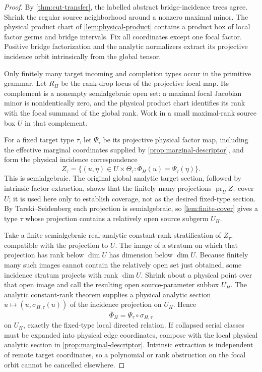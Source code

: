 \begin{proof}
By \cref{thm:cut-transfer}, the labelled abstract bridge-incidence trees
agree.  Shrink
the regular source neighborhood around a nonzero maximal minor.  The physical
product chart of \cref{lem:physical-product} contains a product box of local
factor germs and bridge intervals.  Fix all coordinates except one focal
factor.  Positive bridge factorization and the analytic normalizers extract
its projective incidence orbit intrinsically from the global tensor.

Only finitely many target incoming and completion types occur in the
primitive grammar.  Let \(R_H\) be the rank-drop locus of the projective focal
map.  Its complement is a nonempty semialgebraic open set: a maximal focal
Jacobian minor is nonidentically zero, and the physical product chart
identifies its rank with the focal summand of the global rank.  Work in a
small maximal-rank source box \(U\) in that complement.

For a fixed target type \(\tau\), let \(\Psi_\tau\) be its projective physical
factor map, including the effective marginal coordinates supplied by
\cref{prop:marginal-descriptor}, and form the physical incidence
correspondence
\[
 Z_\tau=\{(u,\eta)\in U\times\Theta_\tau:
             \overline\Phi_H(u)=\Psi_\tau(\eta)\}.
\]
This is semialgebraic.  The original global analytic target section, followed
by intrinsic factor extraction, shows that the finitely many projections
\(\operatorname{pr}_U Z_\tau\) cover \(U\); it is used here only to establish
coverage, not as the desired fixed-type section.  By Tarski--Seidenberg each
projection is semialgebraic, so \cref{lem:finite-cover} gives a type \(\tau\)
whose projection contains a relatively open source subgerm \(U_H\).

Take a finite semialgebraic real-analytic constant-rank stratification of
\(Z_\tau\), compatible with the projection to \(U\).  The image of a stratum
on which that projection has rank below \(\dim U\) has dimension below
\(\dim U\).  Because finitely many such images cannot contain the relatively
open set just obtained, some incidence stratum projects with rank \(\dim U\).
Shrink about a physical point over that open image and call the resulting
open source-parameter subbox \(U_H\).  The analytic constant-rank theorem
supplies a physical analytic section
\(u\mapsto (u,\sigma_{H,\tau}(u))\) of the incidence projection on \(U_H\).
Hence
\[
 \overline\Phi_H=\Psi_\tau\circ\sigma_{H,\tau}
\]
on \(U_H\), exactly the fixed-type local directed relation.  If collapsed
serial classes must be expanded into physical edge coordinates, compose with
the local physical analytic section in
\cref{prop:marginal-descriptor}.  Intrinsic extraction is independent of
remote target coordinates, so a polynomial or rank obstruction on the focal
orbit cannot be cancelled elsewhere.
\end{proof}

